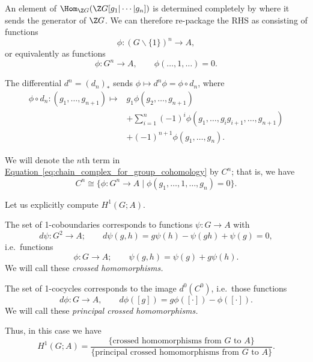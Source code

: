 \documentclass[main.tex]{subfiles}
\begin{document}
An element of $\Hom_{\Z G}(\Z G[g_{1}|\cdots|g_{n}])$ is determined completely by where it sends the generator of $\Z G$. We can therefore re-package the RHS as consisting of functions
\begin{equation*}
  \phi\colon (G\smallsetminus\{1\})^{n} \to A,
\end{equation*}
or equivalently as functions
\begin{equation*}
  \phi\colon G^{n} \to A,\qquad \phi(\ldots, 1, \ldots) = 0.
\end{equation*}

The differential $d^{n} = (d_{n})_{*}$ sends $\phi \mapsto d^{n} \phi = \phi \circ d_{n}$, where
\begin{align*}
  \phi \circ d_{n}\colon (g_{1}, \ldots, g_{n+1}) \mapsto & g_{1}\phi(g_{2}, \ldots, g_{n+1}) \\
  &+ \sum_{i = 1}^{n} (-1)^{i} \phi(g_{1}, \ldots, g_{i}g_{i+1}, \ldots, g_{n+1}) \\
  &+ (-1)^{n+1}\phi(g_{1}, \ldots, g_{n}).
\end{align*}

We will denote the $n$th term in \hyperref[eq:chain_complex_for_group_cohomology]{Equation~\ref*{eq:chain_complex_for_group_cohomology}} by $C^{n}$; that is, we have
\begin{equation*}
  C^{n} \cong \{\phi\colon G^{n} \to A\mid \phi(g_{1}, \ldots, 1, \ldots, g_{n}) = 0\}.
\end{equation*}

Let us explicitly compute $H^{1}(G; A)$.

The set of 1-coboundaries corresponds to functions $\psi\colon G \to A$ with
\begin{equation*}
  d\psi\colon G^{2} \to A;\qquad d\psi(g,h) = g\psi(h) - \psi(gh) + \psi(g) = 0,
\end{equation*}
i.e.\ functions
\begin{equation*}
  \phi\colon G \to A;\qquad \psi(g, h) = \psi(g) + g\psi(h).
\end{equation*}
We will call these \emph{crossed homomorphisms.}

The set of 1-cocycles corresponds to the image $d^{0}(C^{0})$, i.e.\ those functions
\begin{equation*}
  d\phi\colon G \to A,\qquad d\phi([g]) = g\phi([\cdot]) - \phi([\cdot]).
\end{equation*}
We will call these \emph{principal crossed homomorphisms.}

Thus, in this case we have
\begin{equation*}
  H^{1}(G; A) = \frac{\{\text{crossed homomorphisms from $G$ to $A$}\}}{\text{\{principal crossed homomorphisms from $G$ to $A$\}}}.
\end{equation*}
\end{document}
